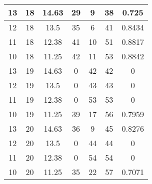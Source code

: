 \documentclass[letterpaper, 12pt]{article}
\begin{document}
\begin{longtable}{|c|c|c|c|c|c|c|}
\hline
13 & 18 & 14.63 & 29 & 9 & 38 & 0.725 \\
\hline
12 & 18 & 13.5 & 35 & 6 & 41 & 0.8434 \\
\hline
11 & 18 & 12.38 & 41 & 10 & 51 & 0.8817 \\
\hline
10 & 18 & 11.25 & 42 & 11 & 53 & 0.8842 \\
\hline
13 & 19 & 14.63 & 0 & 42 & 42 & 0 \\
\hline
12 & 19 & 13.5 & 0 & 43 & 43 & 0 \\
\hline
11 & 19 & 12.38 & 0 & 53 & 53 & 0 \\
\hline
10 & 19 & 11.25 & 39 & 17 & 56 & 0.7959 \\
\hline
13 & 20 & 14.63 & 36 & 9 & 45 & 0.8276 \\
\hline
12 & 20 & 13.5 & 0 & 44 & 44 & 0 \\
\hline
11 & 20 & 12.38 & 0 & 54 & 54 & 0 \\
\hline
10 & 20 & 11.25 & 35 & 22 & 57 & 0.7071 \\
\hline
\end{longtable}
\end{document}
